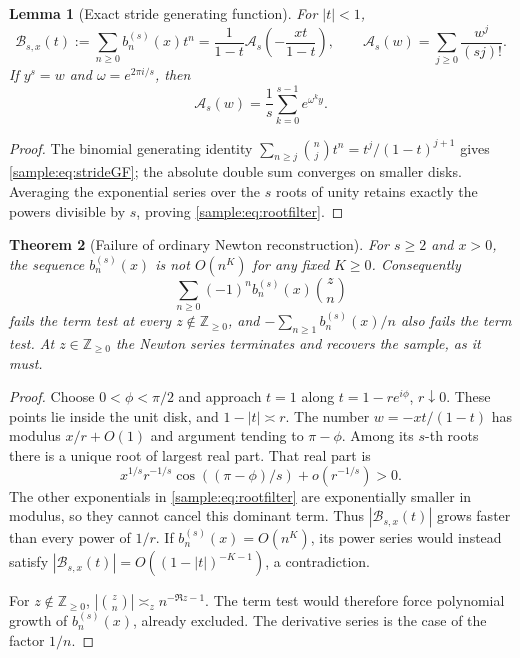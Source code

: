 \documentclass[11pt,a4paper]{article}
\newcommand{\Z}{\mathbb Z}
\newtheorem{theorem}{Theorem}[section]
\newtheorem{lemma}[theorem]{Lemma}
\theoremstyle{definition}
\theoremstyle{remark}
\numberwithin{equation}{section}
\begin{document}
\begin{lemma}[Exact stride generating function]\label{sample:lem:strideGF}
For $|t|<1$,
\begin{equation}\label{sample:eq:strideGF}
\mathcal B_{s,x}(t):=\sum_{n\ge0}b_n^{(s)}(x)t^n
=\frac1{1-t}\mathcal A_s\left(-\frac{xt}{1-t}\right),
\qquad
\mathcal A_s(w)=\sum_{j\ge0}\frac{w^j}{(sj)!}.
\end{equation}
If $y^s=w$ and $\omega=e^{2\pi i/s}$, then
\begin{equation}\label{sample:eq:rootfilter}
\mathcal A_s(w)=\frac1s\sum_{k=0}^{s-1}e^{\omega^ky}.
\end{equation}
\end{lemma}
\begin{proof}
The binomial generating identity
$\sum_{n\ge j}\binom njt^n=t^j/(1-t)^{j+1}$ gives
\eqref{sample:eq:strideGF}; the absolute double sum converges on smaller disks.
Averaging the exponential series over the $s$ roots of unity retains
exactly the powers divisible by $s$, proving \eqref{sample:eq:rootfilter}.
\end{proof}

\begin{theorem}[Failure of ordinary Newton reconstruction]\label{sample:thm:stridefail}
For $s\ge2$ and $x>0$, the sequence $b_n^{(s)}(x)$ is not $O(n^K)$
for any fixed $K\ge0$. Consequently
\[
\sum_{n\ge0}(-1)^nb_n^{(s)}(x)\binom zn
\]
fails the term test at every $z\notin\Z_{\ge0}$, and
$-\sum_{n\ge1}b_n^{(s)}(x)/n$ also fails the term test.
At $z\in\Z_{\ge0}$ the Newton series terminates and recovers the
sample, as it must.
\end{theorem}
\begin{proof}
Choose $0<\phi<\pi/2$ and approach $t=1$ along
$t=1-re^{i\phi}$, $r\downarrow0$. These points lie inside the unit disk,
and $1-|t|\asymp r$. The number
$w=-xt/(1-t)$ has modulus $x/r+O(1)$ and argument tending to
$\pi-\phi$. Among its $s$-th roots there is a unique root of largest
real part. That real part is
\[
x^{1/s}r^{-1/s}\cos((\pi-\phi)/s)+o(r^{-1/s})>0.
\]
The other exponentials in \eqref{sample:eq:rootfilter} are exponentially
smaller in modulus, so they cannot cancel this dominant term. Thus
$|\mathcal B_{s,x}(t)|$ grows faster than every power of $1/r$.
If $b_n^{(s)}(x)=O(n^K)$, its power series would instead satisfy
$|\mathcal B_{s,x}(t)|=O((1-|t|)^{-K-1})$, a contradiction.

For $z\notin\Z_{\ge0}$,
$|\binom zn|\asymp_z n^{-\Re z-1}$. The term test would therefore
force polynomial growth of $b_n^{(s)}(x)$, already excluded.
The derivative series is the case of the factor $1/n$.
\end{proof}
\end{document}
